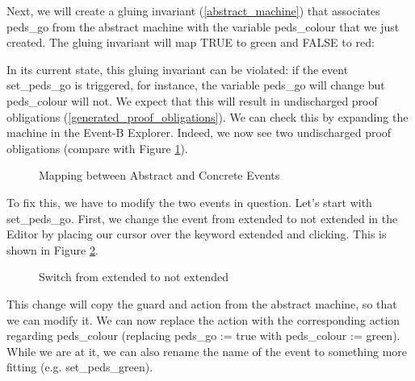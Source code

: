 Next, we will create a gluing invariant (\ref{abstract_machine}) that associates \textsf{peds\_go} from the abstract machine with the variable \textsf{peds\_colour} that we just created.  The gluing invariant will map \textsf{TRUE} to \textsf{green} and \textsf{FALSE} to \textsf{red}:


In its current state, this gluing invariant can be violated: if the event \textsf{set\_peds\_go} is triggered, for instance, the variable \textsf{peds\_go} will change but \textsf{peds\_\-colour} will not.  We expect that this will result in undischarged proof obligations (\ref{generated_proof_obligations}).  We can check this by expanding the machine in the Event-B Explorer.  Indeed, we now see two undischarged proof obligations (compare with Figure \ref{fig_tut_07_undischarged}).

\begin{figure}[!ht]
\begin{center}
	\caption{Mapping between Abstract and Concrete Events}
	\label{fig_tut_07_undischarged}
\end{center}
\end{figure}

To fix this, we have to modify the two events in question.  Let's start with \textsf{set\_peds\_go}.  First, we change the event from extended to not extended in the Editor by placing our cursor over the keyword \textsf{extended} and clicking. This is shown in Figure \ref{fig_tut_07_event_refinement}.

\begin{figure}[!ht]
\begin{center}
	\caption{Switch from extended to not extended}
	\label{fig_tut_07_event_refinement}
\end{center}
\end{figure}

This change will copy the guard and action from the abstract machine, so that we can modify it.  We can now replace the action with the corresponding action regarding \textsf{peds\_colour} (replacing \textsf{peds\_go := true} with \textsf{peds\_colour := green}).  While we are at it, we can also rename the name of the event to something more fitting (e.g. \textsf{set\_peds\_green}).


